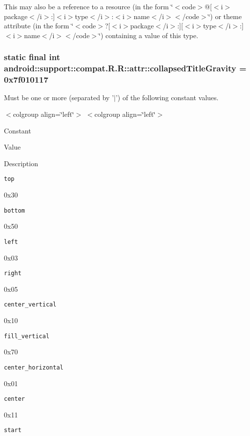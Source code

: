 This may also be a reference to a resource (in the form \char`\"{}$<$code$>$@\mbox{[}$<$i$>$package$<$/i$>$:\mbox{]}$<$i$>$type$<$/i$>$:$<$i$>$name$<$/i$>$$<$/code$>$\char`\"{}) or theme attribute (in the form \char`\"{}$<$code$>$?\mbox{[}$<$i$>$package$<$/i$>$:\mbox{]}\mbox{[}$<$i$>$type$<$/i$>$:\mbox{]}$<$i$>$name$<$/i$>$$<$/code$>$\char`\"{}) containing a value of this type. \hypertarget{classandroid_1_1support_1_1compat_1_1_r_1_1attr_e79a89bb7de5e430e78e6e3d1528892e}{
\subsubsection[{collapsedTitleGravity}]{\setlength{\rightskip}{0pt plus 5cm}static final int android::support::compat.R.R::attr::collapsedTitleGravity = 0x7f010117}}
\label{classandroid_1_1support_1_1compat_1_1_r_1_1attr_e79a89bb7de5e430e78e6e3d1528892e}


Must be one or more (separated by '$|$') of the following constant values. \begin{TabularC}{0}
\hline
\end{TabularC}
$<$colgroup align=\char`\"{}left\char`\"{}$>$ $<$colgroup align=\char`\"{}left\char`\"{}$>$ 

Constant

Value

Description 

{\tt top}

0x30

{\tt bottom}

0x50

{\tt left}

0x03

{\tt right}

0x05

{\tt center\_\-vertical}

0x10

{\tt fill\_\-vertical}

0x70

{\tt center\_\-horizontal}

0x01

{\tt center}

0x11

{\tt start}

